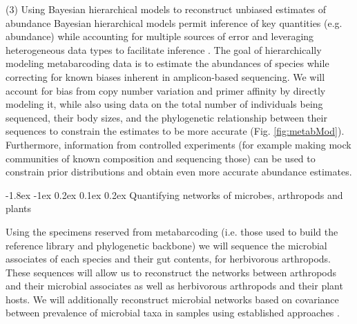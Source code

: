 \documentclass[11pt]{article}
\makeatletter
\renewcommand\subsection{\@startsection{subsection}{1}{\z@}%
                                  {-1.8ex \@plus -1ex \@minus 0.2ex}%
                                  {0.1ex \@plus 0.2ex}%
                                  {\normalfont\large\bfseries}}
\renewcommand{\paragraph}{\@startsection{paragraph}{4}{\z@}
  {1ex \@plus 1ex \@minus .2ex}{-1em}
  {\normalfont\normalsize\it}
}
\makeatother
\begin{document}
\paragraph{(3) Using Bayesian hierarchical models to reconstruct
  unbiased estimates of abundance}
Bayesian hierarchical models permit inference of key quantities
(e.g. abundance) while accounting for multiple sources of error and
leveraging heterogeneous data types to facilitate inference
\citep{royleDorazio}.  The goal of hierarchically modeling
metabarcoding data is to estimate the abundances of species while
correcting for known biases inherent in amplicon-based sequencing.  We
will account for bias from copy number variation and primer affinity
\citep{elbrecht2015} by directly modeling it, while also
using data on the total number of individuals being sequenced, their
body sizes, and the phylogenetic relationship between their sequences
to constrain the estimates to be more accurate
(Fig. \ref{fig:metabMod}).  Furthermore, information from controlled
experiments (for example making mock communities of known composition
and sequencing those) can be used to constrain prior distributions and
obtain even more accurate abundance estimates.


\subsection{Quantifying networks of microbes, arthropods and plants}

Using the specimens reserved from metabarcoding (i.e. those used to
build the reference library and phylogenetic backbone) we will
sequence the microbial associates of each species and their gut
contents, for herbivorous arthropods.  These sequences will allow us
to reconstruct the networks between arthropods and their microbial
associates as well as herbivorous arthropods and their plant hosts.
We will additionally reconstruct microbial networks based on
covariance between prevalence of microbial taxa in samples using
established approaches \citep{kurtz2015}.





\vbox{}
\end{document}
